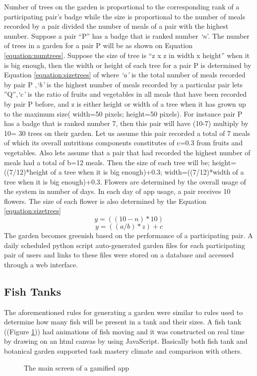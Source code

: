 \documentclass{sig-alternate}
\begin{document}
Number of trees on the garden is proportional to the corresponding rank of a participating pair's badge while the size is proportional to the number of meals recorded by a pair divided the number of meals of a pair with the highest number. Suppose a pair ``P'' has a badge that is ranked number \emph{`n'}.  The number of trees in a garden for a pair P will be as shown on Equation \ref{equation:numtrees}. Suppose the size of tree is ``z x z in width x height'' when it is big enough, then the width or height of each tree for a pair P is determined by Equation \ref{equation:sizetrees} of where \emph{`a'} is the total number of meals recorded by pair P ,\emph{`b'} is the highest number of meals recorded by a particular pair lets ''Q'',\emph{`c'} is the ratio of fruits and vegetables in all meals that have been recorded by pair P before, and z is either height or width of a tree when it has grown up to the maximum size( width=50 pixels; height=50 pixels).   For instance pair P has a badge that is ranked number 7, then this pair will have (10-7) multiply by 10= 30 trees on their garden. Let us assume this pair recorded a total of 7 meals of which its overall nutritions components constitutes of c=0.3 from fruits and vegetables. Also lets assume that a pair that had recorded the highest number of meals had a total of b=12 meals. Then the size of each tree will be; height=((7/12)*height of a tree when it is big enough)+0.3; width=((7/12)*width of a tree when it is big enough)+0.3.  Flowers are determined by the overall usage of the system in number of days. In each day of app usage, a pair receives 10 flowers. The size of each flower is also determined by the Equation \ref{equation:sizetrees}
\begin{equation}
\label{equation:numtrees}
y=((10-n)*10) 
\end{equation}
\begin{equation}
\label{equation:sizetrees}
y=((a/b)*z)+c 
\end{equation}
The garden becomes greenish based on the performance of a participating pair. A daily scheduled python script auto-generated garden files for each participating pair of users and links to these files were stored on a database and accessed through a web interface.
\subsection*{\textbf{Fish Tanks}}
The aforementioned rules for generating a garden were similar to rules used to determine how many fish will be present in a tank and their sizes. A fish tank ((Figure \ref{figure:tank})) had animations of fish moving and it was constructed on real time by drawing on an html canvas by using JavaScript. Basically both fish tank and botanical garden supported task mastery climate and comparison with others.
\begin{figure}[H]
\centering
{}
\caption{The main screen of a gamified app}
\label{figure:tank}
\end{figure}
\end{document}
